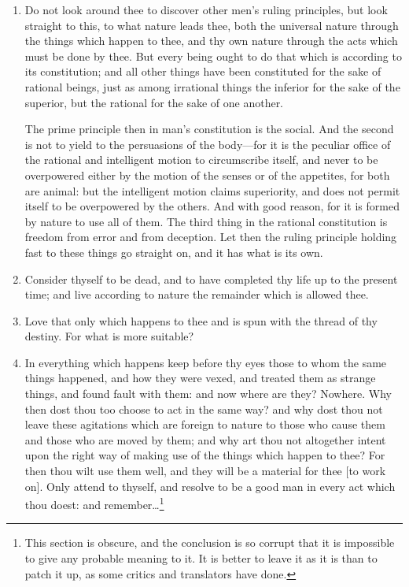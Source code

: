 \begin{enumerate}
\item Do not look around thee to discover other men's ruling principles, but look straight to this, to what nature leads thee, both the universal nature through the things which happen to thee, and thy own nature through the acts which must be done by thee. But every being ought to do that which is according to its constitution; and all other things have been constituted for the sake of rational beings, just as among irrational things the inferior for the sake of the superior, but the rational for the sake of one another.

The prime principle then in man's constitution is the social. And the second is not to yield to the persuasions of the body—for it is the peculiar office of the rational and intelligent motion to circumscribe itself, and never to be overpowered either by the motion of the senses or of the appetites, for both are animal: but the intelligent motion claims superiority, and does not permit itself to be overpowered by the others. And with good reason, for it is formed by nature to use all of them. The third thing in the rational constitution is freedom from error and from deception. Let then the ruling principle holding fast to these things go straight on, and it has what is its own.

\item Consider thyself to be dead, and to have completed thy life up to the present time; and live according to nature the remainder which is allowed thee.

\item Love that only which happens to thee and is spun with the thread of thy destiny. For what is more suitable?

\item In everything which happens keep before thy eyes those to whom the same things happened, and how they were vexed, and treated them as strange things, and found fault with them: and now where are they? Nowhere. Why then dost thou too choose to act in the same way? and why dost thou not leave these agitations which are foreign to nature to those who cause them and those who are moved by them; and why art thou not altogether intent upon the right way of making use of the things which happen to thee? For then thou wilt use them well, and they will be a material for thee [{\clarify to work on}]. Only attend to thyself, and resolve to be a good man in every act which thou doest: and remember\ldots\footnote{This section is obscure, and the conclusion is so corrupt that it is impossible to give any probable meaning to it. It is better to leave it as it is than to patch it up, as some critics and translators have done.}


\end{enumerate}
